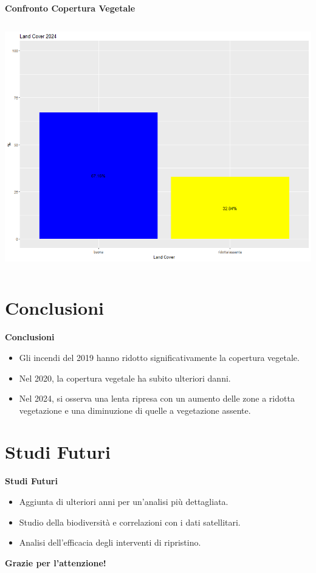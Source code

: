 \documentclass{beamer}
\begin{document}
\begin{frame}[fragile]{\textbf{Confronto Copertura Vegetale}}
\begin{columns}
    \centering
    \includegraphics[width=\textwidth]{Percentuali_Land_Cover_2024.png}
\end{columns}
\end{frame}

\section{Conclusioni}

\begin{frame}{\textbf{Conclusioni}}
\begin{itemize}
    \item Gli incendi del 2019 hanno ridotto significativamente la copertura vegetale.
    \item Nel 2020, la copertura vegetale ha subito ulteriori danni.
    \item Nel 2024, si osserva una lenta ripresa con un aumento delle zone a ridotta vegetazione e una diminuzione di quelle a vegetazione assente.
\end{itemize}
\end{frame}

\section{Studi Futuri}

\begin{frame}{\textbf{Studi Futuri}}
\begin{itemize}
    \item Aggiunta di ulteriori anni per un'analisi più dettagliata.
    \item Studio della biodiversità e correlazioni con i dati satellitari.
    \item Analisi dell'efficacia degli interventi di ripristino.
\end{itemize}
\end{frame}

\begin{frame}{}
\centering
\textbf{Grazie per l'attenzione!}
\end{frame}
\end{document}
